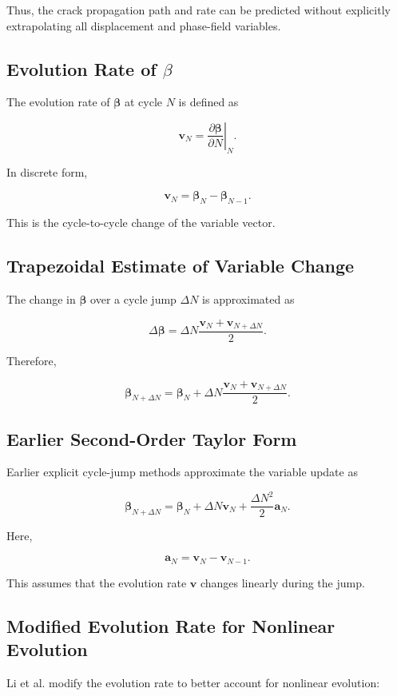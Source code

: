 ﻿\documentclass[11pt,a4paper]{article}
\begin{document}
Thus, the crack propagation path and rate can be predicted without explicitly extrapolating all displacement and phase-field variables.

\subsection{Evolution Rate of $\beta$}

The evolution rate of $\bm{\beta}$ at cycle $N$ is defined as

\[
\bm{v}_N
=
\left.
\frac{\partial \bm{\beta}}{\partial N}
\right|_N.
\]

In discrete form,

\[
\bm{v}_N
=
\bm{\beta}_N-\bm{\beta}_{N-1}.
\]

This is the cycle-to-cycle change of the variable vector.

\subsection{Trapezoidal Estimate of Variable Change}

The change in $\bm{\beta}$ over a cycle jump $\Delta N$ is approximated as

\[
\Delta \bm{\beta}
=
\Delta N
\frac{
\bm{v}_N+\bm{v}_{N+\Delta N}
}{2}.
\]

Therefore,

\[
\bm{\beta}_{N+\Delta N}
=
\bm{\beta}_{N}
+
\Delta N
\frac{
\bm{v}_N+\bm{v}_{N+\Delta N}
}{2}.
\]

\subsection{Earlier Second-Order Taylor Form}

Earlier explicit cycle-jump methods approximate the variable update as

\[
\bm{\beta}_{N+\Delta N}
=
\bm{\beta}_N
+
\Delta N\bm{v}_N
+
\frac{\Delta N^2}{2}\bm{a}_N.
\]

Here,

\[
\bm{a}_N
=
\bm{v}_N-\bm{v}_{N-1}.
\]

This assumes that the evolution rate $\bm{v}$ changes linearly during the jump.

\subsection{Modified Evolution Rate for Nonlinear Evolution}

Li et al. modify the evolution rate to better account for nonlinear evolution:
\end{document}
